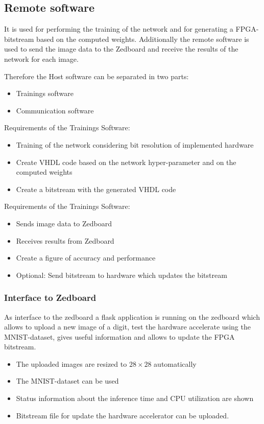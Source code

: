 \subsection{Remote software}

It is used for performing the training of the network and for generating a FPGA-bitstream based on the computed weights. Additionally the remote software is used to send the image data to the Zedboard and receive the results of the network for each image. 

Therefore the Host software can be separated in two parts:
\begin{itemize}
	\item Trainings software
	\item Communication software
\end{itemize} 

Requirements of the Trainings Software:
\begin{itemize} 
	\item Training of the network considering bit resolution of implemented hardware
	\item Create VHDL code based on the network hyper-parameter and on the computed weights
	\item Create a bitstream with the generated VHDL code
\end{itemize}

Requirements of the Trainings Software:
\begin{itemize}
	\item Sends image data to Zedboard
	\item Receives results from Zedboard
	\item Create a figure of accuracy and performance   
	\item Optional: Send bitstream to hardware which updates the bitstream 
\end{itemize}

\subsubsection{Interface to Zedboard} \label{subsec:InterfaceRemoteZed}
As interface to the zedboard a flask application is running on the zedboard which allows to upload a new image of a digit, test the hardware accelerate using the MNIST-dataset, gives useful information and allows to update the FPGA bitstream. 

\begin{itemize}
	\item The uploaded images are resized to $28 \times 28$ automatically
	\item The MNIST-dataset can be used
	\item Status information about the inference time and CPU utilization are shown
	\item Bitstream file for update the hardware accelerator can be uploaded. 
\end{itemize}